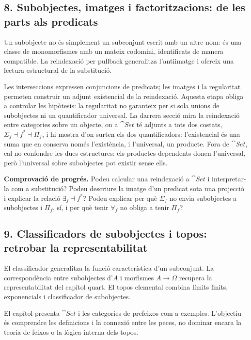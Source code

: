 \subsection*{8. Subobjectes, imatges i factoritzacions: de les parts als predicats}

Un subobjecte no és simplement un subconjunt escrit amb un
altre nom: és una classe de monomorfismes amb un mateix
codomini, identificats de manera compatible. La reindexació
per pullback generalitza l'antiimatge i ofereix una lectura
estructural de la substitució.

Les interseccions expressen conjuncions de predicats; les
imatges i la regularitat permeten construir un adjunt
existencial de la reindexació. Aquesta etapa obliga a
controlar les hipòtesis: la regularitat no garanteix per
si sola unions de subobjectes ni un quantificador universal.
La darrera secció mira la reindexació entre categories sobre
un objecte, on a $\cat{Set}$ té adjunts a tots dos costats,
$\Sigma_f\dashv f^*\dashv\Pi_f$, i hi mostra d'on surten els
dos quantificadors: l'existencial és una suma que en conserva
només l'existència, i l'universal, un producte. Fora de $\cat{Set}$,
cal no confondre les dues estructures: els productes dependents
donen l'universal, però l'universal sobre subobjectes pot existir
sense ells.

\noindent\textbf{Comprovació de progrés.} Podeu calcular una
reindexació a $\cat{Set}$ i interpretar-la com a substitució?
Podeu descriure la imatge d'un predicat sota una projecció
i explicar la relació $\exists_f\dashv f^*$? Podeu explicar per
què $\Sigma_f$ no envia subobjectes a subobjectes i $\Pi_f$, sí,
i per què tenir $\forall_f$ no obliga a tenir $\Pi_f$?

\subsection*{9. Classificadors de subobjectes i topos: retrobar la representabilitat}

El classificador generalitza la funció característica d'un
subconjunt. La correspondència entre subobjectes d'$A$ i
morfismes $A\to\Omega$ recupera la representabilitat del
capítol quart. El topos elemental combina límits finits,
exponencials i classificador de subobjectes.

El capítol presenta $\cat{Set}$ i les categories de prefeixos
com a exemples. L'objectiu és comprendre les definicions
i la connexió entre les peces, no dominar encara la
teoria de feixos o la lògica interna dels topos.

